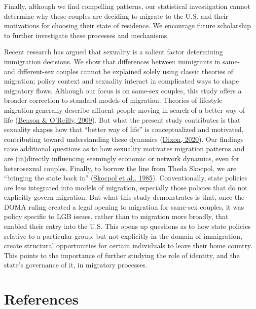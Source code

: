 \documentclass[
  12pt,
]{article}
\begin{document}
Finally, although we find compelling patterns, our statistical investigation cannot determine why these couples are deciding to migrate to the U.S. and their motivations for choosing their state of residence. We encourage future scholarship to further investigate these processes and mechanisms.

Recent research has argued that sexuality is a salient factor determining immigration decisions. We show that differences between immigrants in same- and different-sex couples cannot be explained solely using classic theories of migration; policy context and sexuality interact in complicated ways to shape migratory flows. Although our focus is on same-sex couples, this study offers a broader correction to standard models of migration. Theories of lifestyle migration generally describe affluent people moving in search of a better way of life (\protect\hyperlink{ref-benson_2009}{Benson \& O'Reilly, 2009}). But what the present study contributes is that sexuality shapes how that ``better way of life'' is conceptualized and motivated, contributing toward understanding these dynamics (\protect\hyperlink{ref-dixon_2020}{Dixon, 2020}). Our findings raise additional questions as to how sexuality motivates migration patterns and are (in)directly influencing seemingly economic or network dynamics, even for heterosexual couples. Finally, to borrow the line from Theda Skocpol, we are ``bringing the state back in'' (\protect\hyperlink{ref-skocpol_1985}{Skocpol et al., 1985}). Conventionally, state policies are less integrated into models of migration, especially those policies that do not explicitly govern migration. But what this study demonstrates is that, once the DOMA ruling created a legal opening to migration for same-sex couples, it was policy specific to LGB issues, rather than to migration more broadly, that enabled their entry into the U.S. This opens up questions as to how state policies relative to a particular group, but not explicitly in the domain of immigration, create structural opportunities for certain individuals to leave their home country. This points to the importance of further studying the role of identity, and the state's governance of it, in migratory processes.

\hypertarget{references}{%
\section{References}\label{references}}

\setlength{\parindent}{-0.2in}
\setlength{\leftskip}{0.2in}
\setlength{\parskip}{8pt}
\end{document}
